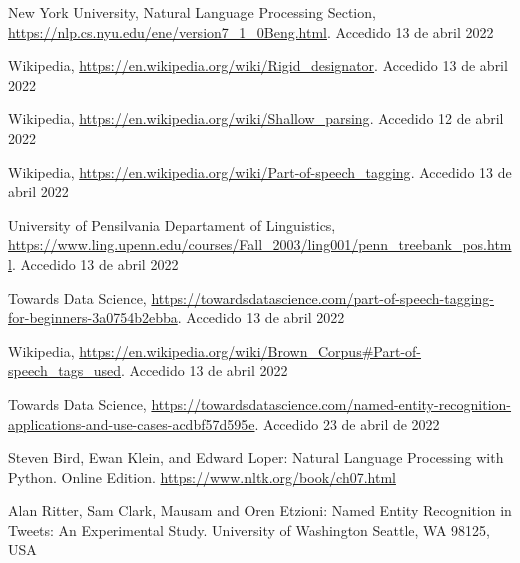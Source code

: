 \documentclass[runningheads]{llncs}
\begin{document}
\begin{thebibliography}{8}
%
%
%



New York University, Natural Language Processing Section, \url{https://nlp.cs.nyu.edu/ene/version7\_1\_0Beng.html}. Accedido 13
de abril 2022

Wikipedia, \url{https://en.wikipedia.org/wiki/Rigid\_designator}. Accedido 13
de abril 2022

Wikipedia, \url{https://en.wikipedia.org/wiki/Shallow\_parsing}. Accedido 12 de abril
2022

Wikipedia, \url{https://en.wikipedia.org/wiki/Part-of-speech\_tagging}. Accedido 13 de abril
2022

University of Pensilvania Departament of Linguistics, \url{https://www.ling.upenn.edu/courses/Fall\_2003/ling001/penn\_treebank\_pos.html}. Accedido 13 de abril 2022

Towards Data Science, \url{https://towardsdatascience.com/part-of-speech-tagging-for-beginners-3a0754b2ebba}. Accedido 13 de abril
2022

Wikipedia, \url{https://en.wikipedia.org/wiki/Brown\_Corpus\#Part-of-speech\_tags\_used}. Accedido 13 de abril 2022


Towards Data Science, \url{https://towardsdatascience.com/named-entity-recognition-applications-and-use-cases-acdbf57d595e}. Accedido 23 de abril de 2022

Steven Bird, Ewan Klein, and Edward Loper: Natural Language Processing with Python. Online Edition. \url{https://www.nltk.org/book/ch07.html}

Alan Ritter, Sam Clark, Mausam and Oren Etzioni: Named Entity Recognition in Tweets:
An Experimental Study. University of Washington Seattle, WA 98125, USA


\end{thebibliography}
\end{document}

